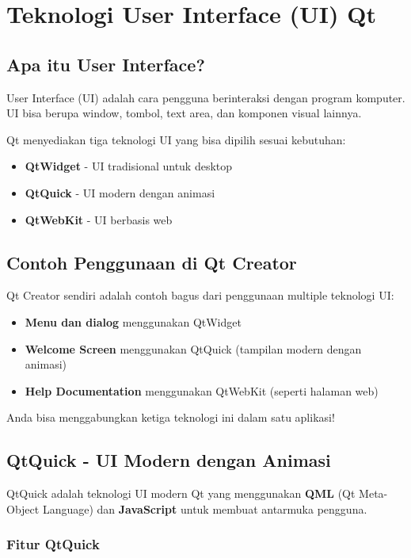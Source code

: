 \section{Teknologi User Interface (UI) Qt}

\subsection{Apa itu User Interface?}

User Interface (UI) adalah cara pengguna berinteraksi dengan program komputer. UI bisa berupa window, tombol, text area, dan komponen visual lainnya.

Qt menyediakan tiga teknologi UI yang bisa dipilih sesuai kebutuhan:
\begin{itemize}
\item \textbf{QtWidget} - UI tradisional untuk desktop
\item \textbf{QtQuick} - UI modern dengan animasi
\item \textbf{QtWebKit} - UI berbasis web
\end{itemize}

\subsection{Contoh Penggunaan di Qt Creator}

Qt Creator sendiri adalah contoh bagus dari penggunaan multiple teknologi UI:

\begin{itemize}
\item \textbf{Menu dan dialog} menggunakan QtWidget
\item \textbf{Welcome Screen} menggunakan QtQuick (tampilan modern dengan animasi)
\item \textbf{Help Documentation} menggunakan QtWebKit (seperti halaman web)
\end{itemize}

Anda bisa menggabungkan ketiga teknologi ini dalam satu aplikasi!

\subsection{QtQuick - UI Modern dengan Animasi}

QtQuick adalah teknologi UI modern Qt yang menggunakan \textbf{QML} (Qt Meta-Object Language) dan \textbf{JavaScript} untuk membuat antarmuka pengguna.

\subsubsection{Fitur QtQuick}

